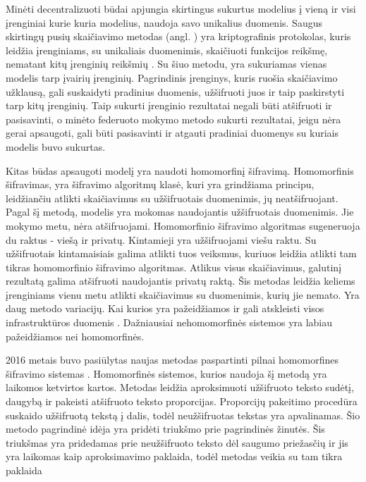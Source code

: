 \documentclass{VUMIFInfBakalaurinis}
\begin{document}
\par Minėti decentralizuoti būdai apjungia skirtingus sukurtus modelius į vieną ir visi įrenginiai kurie kuria modelius, naudoja savo unikalius duomenis. Saugus skirtingų pusių skaičiavimo metodas (angl. ) yra kriptografinis protokolas, kuris leidžia įrenginiams, su unikaliais duomenimis, skaičiuoti funkcijos reikšmę, nematant kitų įrenginių reikšmių \cite{6}. Su šiuo metodu, yra sukuriamas vienas modelis tarp įvairių įrenginių. Pagrindinis įrenginys, kuris ruošia skaičiavimo užklausą, gali suskaidyti pradinius duomenis, užšifruoti juos ir taip paskirstyti tarp kitų įrenginių. Taip sukurti įrenginio rezultatai negali būti atšifruoti ir pasisavinti, o minėto federuoto mokymo metodo sukurti rezultatai, jeigu nėra gerai apsaugoti, gali būti pasisavinti ir atgauti pradiniai duomenys su kuriais modelis buvo sukurtas.
\par  Kitas būdas apsaugoti modelį yra naudoti homomorfinį šifravimą. Homomorfinis šifravimas, yra šifravimo algoritmų klasė, kuri yra grindžiama principu, leidžiančiu atlikti skaičiavimus su užšifruotais duomenimis, jų neatšifruojant. Pagal šį metodą, modelis yra mokomas naudojantis užšifruotais duomenimis. Jie mokymo metu, nėra atšifruojami. Homomorfinio šifravimo algoritmas sugeneruoja du raktus - viešą ir privatų. Kintamieji yra užšifruojami viešu raktu. Su užšifruotais kintamaisiais galima atlikti tuos veiksmus, kuriuos leidžia atlikti tam tikras homomorfinio šifravimo algoritmas. Atlikus visus skaičiavimus, galutinį rezultatą galima atšifruoti naudojantis privatų raktą. Šis metodas leidžia keliems įrenginiams vienu metu atlikti skaičiavimus su duomenimis, kurių jie nemato. Yra daug metodo variacijų. Kai kurios yra pažeidžiamos ir gali atskleisti visos infrastruktūros duomenis \cite{7}. Dažniausiai nehomomorfinės sistemos yra labiau pažeidžiamos nei homomorfinės.
\par 2016 metais buvo pasiūlytas naujas metodas paspartinti pilnai homomorfines šifravimo sistemas \cite{8}. Homomorfinės sistemos, kurios naudoja šį metodą yra laikomos ketvirtos kartos. Metodas leidžia aproksimuoti užšifruoto teksto sudėtį, daugybą ir pakeisti atšifruoto teksto proporcijas. 
Proporcijų pakeitimo procedūra suskaido užšifruotą tekstą į dalis, todėl neužšifruotas tekstas yra apvalinamas. Šio metodo pagrindinė idėja yra pridėti triukšmo prie pagrindinės žinutės. Šis triukšmas yra pridedamas prie neužšifruoto teksto dėl saugumo priežasčių ir jis yra laikomas kaip aproksimavimo paklaida, todėl metodas veikia su tam tikra paklaida
\end{document}
